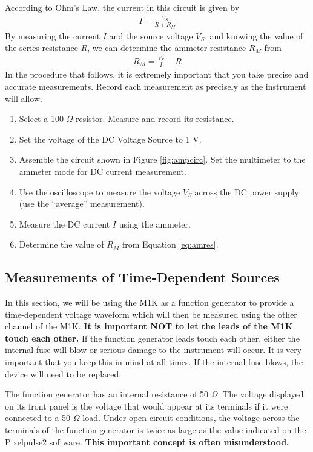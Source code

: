 \documentclass[12pt]{../manual}
\begin{document}
According to Ohm's Law, the current in this circuit is given by
\begin{align}
I = \frac{V_S}{R + R_M}
\end{align}
By measuring the current $I$ and the source voltage $V_S$, and knowing the value of the series resistance $R$, we can determine the ammeter resistance $R_M$ from
\begin{align}
R_M = \frac{V_S}{I} - R \label{eq:amres}
\end{align}
In the procedure that follows, it is extremely important that you take precise and accurate measurements. Record each measurement as precisely as the instrument will allow.
\begin{enumerate}
\item Select a 100 $\Omega$ resistor. Measure and record its resistance. 
\item Set the voltage of the DC Voltage Source to 1 V.
\item Assemble the circuit shown in Figure \ref{fig:ampcirc}. Set the multimeter to the ammeter mode for DC current measurement.
\item Use the oscilloscope to measure the voltage $V_S$ across the DC power supply (use the ``average'' measurement).
\item Measure the DC current $I$ using the ammeter. 
\item Determine the value of $R_M$ from Equation \eqref{eq:amres}. 
\end{enumerate}

\subsection{Measurements of Time-Dependent Sources}
In this section, we will be using the M1K as a function generator to provide a time-dependent voltage waveform which will then be measured using the other channel of the M1K. \textbf{It is important NOT to let the leads of the M1K touch each other.} If the function generator leads touch each other, either the internal fuse will blow or serious damage to the instrument will occur. It is very important that you keep this in mind at all times. If the internal fuse blows, the device will need to be replaced.

The function generator has an internal resistance of 50 $\Omega$. The voltage displayed on its front panel is the voltage that would appear at its terminals if it were connected to a 50 $\Omega$ load. Under open-circuit conditions, the voltage across the terminals of the function generator is twice as large as the value indicated on the Pixelpulse2 software. \textbf{This important concept is often misunderstood.}
\end{document}
